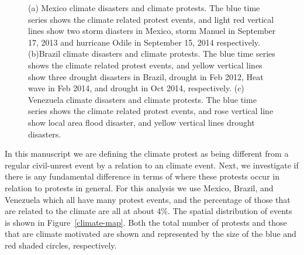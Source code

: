 \documentclass[9pt,twocolumn,twoside]{pnas-new}
\begin{document}
\begin{figure}[ht]
	\centering
	\caption{(a) Mexico climate disasters and climate protests. The blue time series shows the climate related protest events, and light red vertical lines show two storm diasters in Mexico, storm Manuel in September 17, 2013 and hurricane Odile in September 15, 2014 respectively. (b)Brazil climate disasters and climate protests. The blue time series shows the climate related protest events, and yellow vertical lines show three drought disasters in Brazil, drought in Feb 2012, Heat wave in Feb 2014, and drought in Oct 2014, respectively. (c) Venezuela climate disasters and climate protests. The blue time series shows the climate related protest events, and rose vertical line show local area flood disaster, and yellow vertical lines drought disasters.}
\label{climate-timeseries}
\end{figure}


In this manuscript we are defining the climate protest as being different from a regular civil-unrest event by a relation to an climate event.
Next, we investigate if there is any fundamental difference in terms of where these protests occur in relation to protests in general.
For this analysis we use Mexico, Brazil, and Venezuela which all have many protest events, and the percentage of those that are related to the climate are all at about 4\%.
The spatial distribution of events is shown in  Figure~\ref{climate-map}.
Both the total number of protests and those that are climate motivated are shown and represented by the size of the blue and red shaded circles, respectively.
\end{document}
